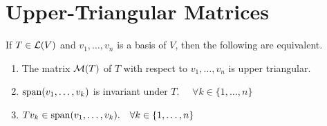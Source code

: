 \section{Upper-Triangular Matrices}

\setcounter{thm}{38}
\begin{thm} 
  \label{conditions for upper-triangular matrix}
  If $T \in \mathcal{L} (V)$ and $v_1, \dots, v_n$ is a basis of $V$, then the following are equivalent.
  \begin{enumerate}[label=\textbf{(\alph*)}]
    \item The matrix $\mathcal{M}(T)$ of $T$ with respect to $v_1, \dots, v_n$ is upper triangular.
    \item $\operatorname{span} (v_1, \dots, v_k)$ is invariant under $T$. $\quad \forall k \in \{ 1, \dots, n\}$
    \item $T v_k \in \operatorname{span} (v_1, \dots, v_k). \quad \forall k \in \{1, \dots, n\}$
  \end{enumerate}
\end{thm}
